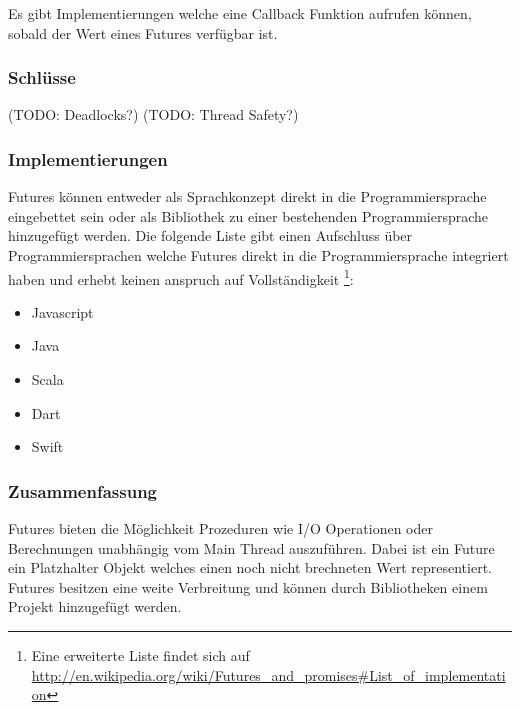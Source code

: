 Es gibt Implementierungen welche eine Callback Funktion aufrufen können, sobald der Wert eines Futures verfügbar ist. 

\subsubsection{Schlüsse}
(TODO: Deadlocks?)
(TODO: Thread Safety?)

\subsubsection{Implementierungen}
Futures können entweder als Sprachkonzept direkt in die Programmiersprache eingebettet sein oder als Bibliothek zu einer bestehenden Programmiersprache hinzugefügt werden. Die folgende Liste gibt einen Aufschluss über Programmiersprachen welche Futures direkt in die Programmiersprache integriert haben und erhebt keinen anspruch auf Vollständigkeit \footnote{Eine erweiterte Liste findet sich auf \url{http://en.wikipedia.org/wiki/Futures_and_promises#List_of_implementation}}:

\begin{itemize}
  \item Javascript
  \item Java
  \item Scala
  \item Dart
  \item Swift
\end{itemize}  

\subsubsection{Zusammenfassung}
Futures bieten die Möglichkeit Prozeduren wie I/O Operationen oder Berechnungen unabhängig vom Main Thread auszuführen. Dabei ist ein Future ein Platzhalter Objekt welches einen noch nicht brechneten Wert representiert. Futures besitzen eine weite Verbreitung und können durch Bibliotheken einem Projekt hinzugefügt werden.

